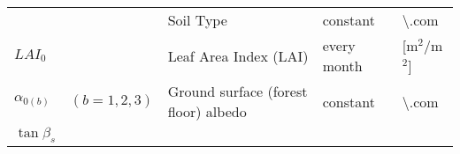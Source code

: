 \begin{longtable}[]{@{}lllll@{}}
\begin{minipage}[t]{0.17\columnwidth}
\end{minipage} & \begin{minipage}[t]{0.17\columnwidth}\raggedright
\strut
\end{minipage} & \begin{minipage}[t]{0.17\columnwidth}\raggedright
Soil Type\strut
\end{minipage} & \begin{minipage}[t]{0.17\columnwidth}\raggedright
constant\strut
\end{minipage} & \begin{minipage}[t]{0.17\columnwidth}\raggedright
\textbackslash.com\strut
\end{minipage}\tabularnewline
\begin{minipage}[t]{0.17\columnwidth}\raggedright
\(LAI_0\)\strut
\end{minipage} & \begin{minipage}[t]{0.17\columnwidth}\raggedright
\strut
\end{minipage} & \begin{minipage}[t]{0.17\columnwidth}\raggedright
Leaf Area Index (LAI)\strut
\end{minipage} & \begin{minipage}[t]{0.17\columnwidth}\raggedright
every month\strut
\end{minipage} & \begin{minipage}[t]{0.17\columnwidth}\raggedright
{[}m\(^2\)/m\(^2\){]}\strut
\end{minipage}\tabularnewline
\begin{minipage}[t]{0.17\columnwidth}\raggedright
\(\alpha_{0(b)}\)\strut
\end{minipage} & \begin{minipage}[t]{0.17\columnwidth}\raggedright
\((b=1,2,3)\)\strut
\end{minipage} & \begin{minipage}[t]{0.17\columnwidth}\raggedright
Ground surface (forest floor) albedo\strut
\end{minipage} & \begin{minipage}[t]{0.17\columnwidth}\raggedright
constant\strut
\end{minipage} & \begin{minipage}[t]{0.17\columnwidth}\raggedright
\textbackslash.com\strut
\end{minipage}\tabularnewline
\begin{minipage}[t]{0.17\columnwidth}\raggedright
\(\tan\beta_{s}\)\strut
\end{minipage} & \begin{minipage}[t]{0.17\columnwidth}\raggedright

\end{minipage}
\end{longtable}
